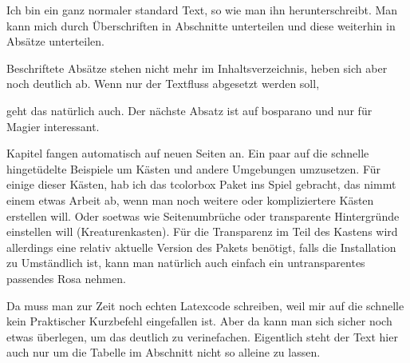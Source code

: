 \documentclass{Ilaris}
\begin{document}
\anfang
{}
\inhaltsverzeichnis
\newpage
\hauptteil
{}
\platz
{}
\lizenz
{}
\spaltenanfang
{}


Ich bin ein ganz normaler standard Text, so wie man ihn herunterschreibt. Man kann mich durch Überschriften in Abschnitte unterteilen und diese weiterhin in Absätze unterteilen.

Beschriftete Absätze stehen nicht mehr im Inhaltsverzeichnis, heben sich aber noch deutlich ab. Wenn nur der Textfluss abgesetzt werden soll,

geht das natürlich auch. Der nächste Absatz ist auf bosparano und nur für Magier interessant.

\lipsum[1-4]

Kapitel fangen automatisch auf neuen Seiten an.
Ein paar auf die schnelle hingetüdelte Beispiele um Kästen und andere Umgebungen umzusetzen. Für einige dieser Kästen, hab ich das tcolorbox Paket ins Spiel gebracht, das nimmt einem etwas Arbeit ab, wenn man noch weitere oder kompliziertere Kästen erstellen will. Oder soetwas wie Seitenumbrüche oder transparente Hintergründe einstellen will (Kreaturenkasten). Für die Transparenz im Teil des Kastens wird allerdings eine relativ aktuelle Version des Pakets benötigt, falls die Installation zu Umständlich ist, kann man natürlich auch einfach ein untransparentes passendes Rosa nehmen.

Da muss man zur Zeit noch echten Latexcode schreiben, weil mir auf die schnelle kein Praktischer Kurzbefehl eingefallen ist. Aber da kann man sich sicher noch etwas überlegen, um das deutlich zu verinefachen. Eigentlich steht der Text hier auch nur um die Tabelle im Abschnitt nicht so alleine zu lassen.
\end{document}
